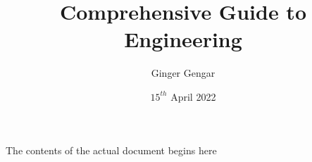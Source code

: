 \documentclass[a4paper, 12pt]{report}
\begin{document}
\title{Comprehensive Guide to Engineering}
\author{Ginger Gengar}
\date{$15^{th}$ April 2022}
\maketitle
\newpage

The contents of the actual document begins here
\end{document}
